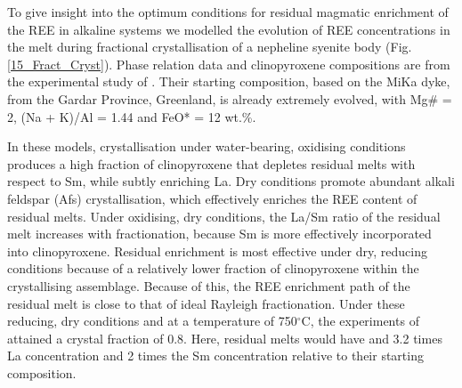 \documentclass[final,authoryear,3p,times,twocolumn]{elsarticle}
\newcommand{\dgCs}{$^\circ$C}
\begin{document}
To give insight into the optimum conditions for residual magmatic enrichment of the REE in alkaline systems we modelled the evolution of REE concentrations in the melt during fractional crystallisation of a nepheline syenite body (Fig. \ref{15_Fract_Cryst}). Phase relation data and clinopyroxene compositions are from the experimental study of \citet[][]{Giehl2013}. Their starting composition, based on the MiKa dyke, from the Gardar Province, Greenland, is already extremely evolved, with Mg\# = 2, (Na + K)/Al = 1.44 and FeO* = 12 wt.\%.
		
		In these models, crystallisation under water-bearing, oxidising conditions produces a high fraction of clinopyroxene that depletes residual melts with respect to Sm, while subtly enriching La. 
	Dry conditions promote abundant alkali feldspar (Afs) crystallisation, which effectively enriches the REE content of residual melts. Under oxidising, dry conditions, the La/Sm ratio of the residual melt increases with fractionation, because Sm is more effectively incorporated into clinopyroxene.
Residual enrichment is most effective under dry, reducing conditions because of a relatively lower fraction of clinopyroxene within the crystallising assemblage. Because of this, the REE enrichment path of the residual melt is close to that of ideal Rayleigh fractionation.  
	Under these reducing, dry conditions and at a temperature of 750\dgCs, the experiments of \citet{Giehl2013} attained a crystal fraction of 0.8. Here, residual melts would have and 3.2 times La concentration and 2 times the Sm concentration relative to their starting composition. 


\end{document}
